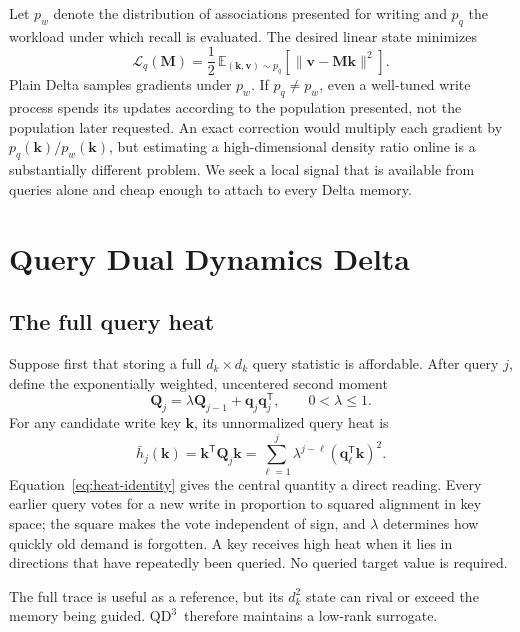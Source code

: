 \documentclass[pdflatex,sn-mathphys-num]{sn-jnl}
\theoremstyle{thmstyleone}
\newcommand{\M}{\bm{M}}
\newcommand{\Q}{\bm{Q}}
\newcommand{\kvec}{\bm{k}}
\newcommand{\qvec}{\bm{q}}
\newcommand{\vvec}{\bm{v}}
\newcommand{\norm}[1]{\lVert#1\rVert}
\newcommand{\QDDD}{\ensuremath{\mathrm{QD}^{3}}}
\begin{document}
Let $p_w$ denote the distribution of associations presented for writing and $p_q$ the workload under which recall is evaluated. The desired linear state minimizes
\begin{equation}
 \mathcal{L}_q(\M)=\frac12\,\mathbb{E}_{(\kvec,\vvec)\sim p_q}
 \left[\norm{\vvec-\M\kvec}^{2}\right].
 \label{eq:query-risk}
\end{equation}
Plain Delta samples gradients under $p_w$. If $p_q\neq p_w$, even a well-tuned write process spends its updates according to the population presented, not the population later requested. An exact correction would multiply each gradient by $p_q(\kvec)/p_w(\kvec)$, but estimating a high-dimensional density ratio online is a substantially different problem. We seek a local signal that is available from queries alone and cheap enough to attach to every Delta memory.

\section{Query Dual Dynamics Delta}\label{sec:method}

\subsection{The full query heat}

Suppose first that storing a full $d_k\times d_k$ query statistic is affordable. After query $j$, define the exponentially weighted, uncentered second moment
\begin{equation}
 \Q_j=\lambda\Q_{j-1}+\qvec_j\qvec_j^{\mathsf T},
 \qquad 0<\lambda\leq1.
 \label{eq:full-trace}
\end{equation}
For any candidate write key $\kvec$, its unnormalized query heat is
\begin{equation}
 \bar h_j(\kvec)=\kvec^{\mathsf T}\Q_j\kvec
 =\sum_{\ell=1}^{j}\lambda^{j-\ell}(\qvec_{\ell}^{\mathsf T}\kvec)^2.
 \label{eq:heat-identity}
\end{equation}
Equation~\eqref{eq:heat-identity} gives the central quantity a direct reading. Every earlier query votes for a new write in proportion to squared alignment in key space; the square makes the vote independent of sign, and $\lambda$ determines how quickly old demand is forgotten. A key receives high heat when it lies in directions that have repeatedly been queried. No queried target value is required.

The full trace is useful as a reference, but its $d_k^2$ state can rival or exceed the memory being guided. \QDDD\ therefore maintains a low-rank surrogate.
\end{document}
